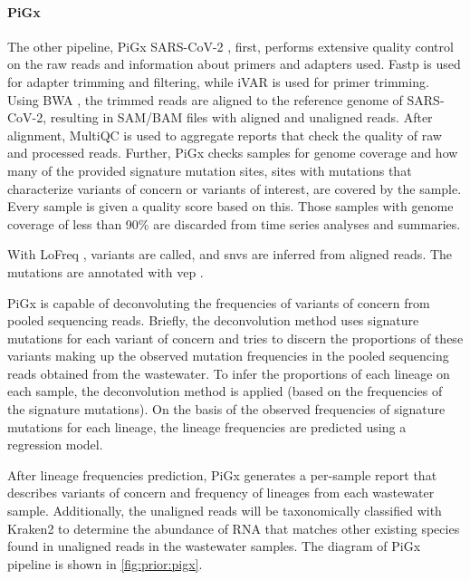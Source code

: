         \paragraph{PiGx}
        The other pipeline, PiGx SARS-CoV-2 \cite{schumann2021}, first, performs extensive quality control on the raw reads and information about primers and adapters used. Fastp \cite{chen2018} is used for adapter trimming and filtering, while iVAR is used for primer trimming. Using BWA \cite{li2013}, the trimmed reads are aligned to the reference genome of SARS-CoV-2, resulting in SAM/BAM files with aligned and unaligned reads. After alignment, MultiQC \cite{multiqc} is used to aggregate reports that check the quality of raw and processed reads. Further, PiGx checks samples for genome coverage and how many of the provided signature mutation sites, sites with mutations that characterize variants of concern or variants of interest, are covered by the sample. Every sample is given a quality score based on this. Those samples with genome coverage of less than 90\% are discarded from time series analyses and summaries.

        With LoFreq \cite{lofreq}, variants are called, and \acrshort{snvs} are inferred from aligned reads. The mutations are annotated with \acrshort{vep} \cite{mclaren2016}. 
        
        PiGx is capable of deconvoluting the frequencies of variants of concern from pooled sequencing reads. Briefly, the deconvolution method uses signature mutations for each variant of concern and tries to discern the proportions of these variants making up the observed mutation frequencies in the pooled sequencing reads obtained from the wastewater. To infer the proportions of each lineage on each sample, the deconvolution method is applied (based on the frequencies of the signature mutations). On the basis of the observed frequencies of signature mutations for each lineage, the lineage frequencies are predicted using a regression model. 
        
        After lineage frequencies prediction, PiGx generates a per-sample report that describes variants of concern and frequency of lineages from each wastewater sample. Additionally, the unaligned reads will be taxonomically classified with Kraken2 \cite{wood2014,wood2019,lu2020} to determine the abundance of RNA that matches other existing species found in unaligned reads in the wastewater samples. The diagram of PiGx pipeline is shown in \cref{fig:prior:pigx}.
        
